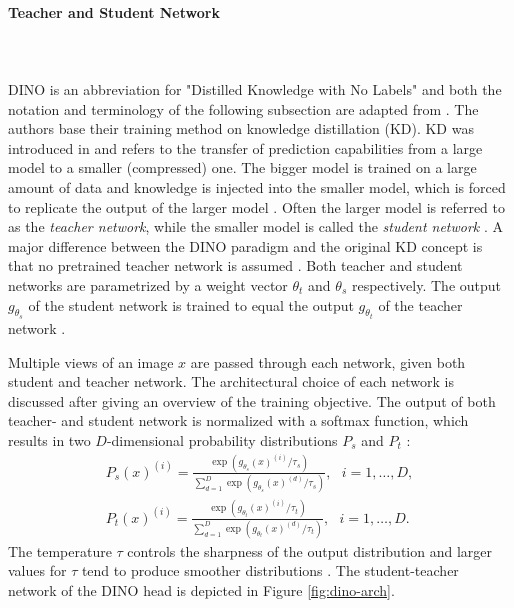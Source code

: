 \paragraph{Teacher and Student Network} \mbox{} \\
\\
DINO is an abbreviation for "Distilled Knowledge with No Labels" and both the notation and terminology of the following subsection are adapted from \citep{Caron2021}.
The authors base their training method on knowledge distillation (KD).
KD was introduced in \citep{Hinton2015} and refers to the transfer of prediction capabilities from a large model to a smaller (compressed) one.
The bigger model is trained on a large amount of data and knowledge is injected into the smaller model, which is forced to replicate the output of the larger model \citep{Hinton2015,Caron2021}.
Often the larger model is referred to as the \textit{teacher network}, while the smaller model is called the \textit{student network} \citep{Caron2021}. 
A major difference between the DINO paradigm and the original KD concept is that no pretrained teacher network is assumed \citep{Caron2021}.
Both teacher and student networks are parametrized by a weight vector $\theta_t$ and $\theta_s$ respectively.
The output $g_{\theta_s}$ of the student network is trained to equal the output $g_{\theta_t}$ of the teacher network \citep{Caron2021}.
\par
Multiple views of an image $x$ are passed through each network, given both student and teacher network.
The architectural choice of each network is discussed after giving an overview of the training objective.
The output of both teacher- and student network is normalized with a softmax function, which results in two $D$-dimensional probability distributions $P_s$ and $P_t$ \citep{Caron2021}:
\begin{align}
	P_{s}(x)^{(i)} = \frac{\exp(g_{\theta_{s}}(x)^{(i)}/\tau_{s})}{\sum_{d=1}^{D}\exp(g_{\theta_{s}}(x)^{(d)}/\tau_{s})}, \hspace{8pt} i=1,\dots,D, \\
	P_{t}(x)^{(i)} = \frac{\exp(g_{\theta_{t}}(x)^{(i)}/\tau_{t})}{\sum_{d=1}^{D}\exp(g_{\theta_{t}}(x)^{(d)}/\tau_{t})}, \hspace{8pt} i=1,\dots,D.
	\label{equation:dino-softmax}
\end{align}
The temperature $\tau$ controls the sharpness of the output distribution \citep{Caron2021} and larger values for $\tau$ tend to produce smoother distributions \citep{Hinton2015}.
The student-teacher network of the DINO head is depicted in Figure \ref{fig:dino-arch}.

